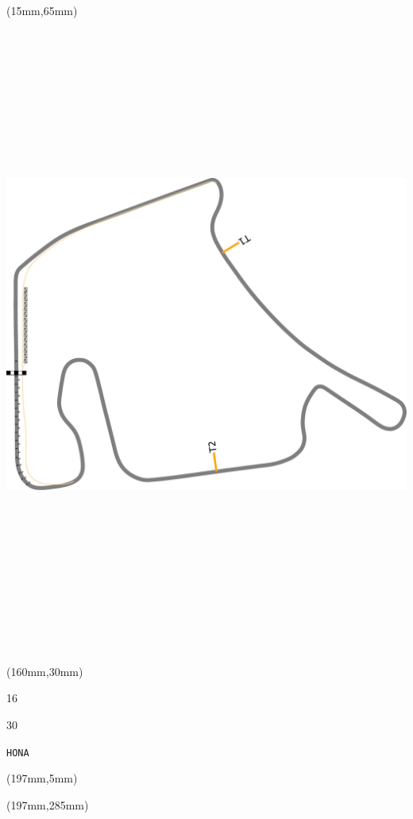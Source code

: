 \begin{textblock*}{185mm}(15mm,65mm)%
\centering
\mbox{\includegraphics[width=185mm,height=210mm,keepaspectratio]{PT/HONA.pdf}}
\end{textblock*}
\begin{textblock*}{40mm}(160mm,30mm)%
\Large
\par{} 
\par16 
\par30 
\par\hfill\tiny\tt HONA\\
\end{textblock*}
\begin{textblock*}{20mm}(197mm,5mm)%
\fbox{\thepage}
\label{HONA}
\end{textblock*}
\begin{textblock*}{20mm}(197mm,285mm)%
\fbox{\thepage}
\end{textblock*}

